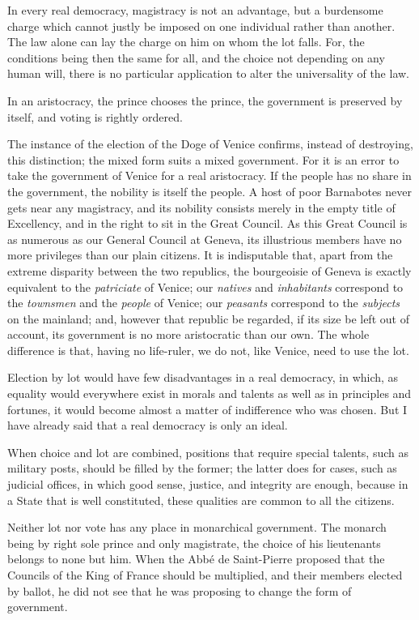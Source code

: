\documentclass[12pt]{book}
\begin{document}
In every real democracy, magistracy is not an advantage, but a burdensome charge which cannot justly be imposed on one individual rather than another. The law alone can lay the charge on him on whom the lot falls. For, the conditions being then the same for all, and the choice not depending on any human will, there is no particular application to alter the universality of the law.

In an aristocracy, the prince chooses the prince, the government is preserved by itself, and voting is rightly ordered.

The instance of the election of the Doge of Venice confirms, instead of destroying, this distinction; the mixed form suits a mixed government. For it is an error to take the government of Venice for a real aristocracy. If the people has no share in the government, the nobility is itself the people. A host of poor Barnabotes never gets near any magistracy, and its nobility consists merely in the empty title of Excellency, and in the right to sit in the Great Council. As this Great Council is as numerous as our General Council at Geneva, its illustrious members have no more privileges than our plain citizens. It is indisputable that, apart from the extreme disparity between the two republics, the bourgeoisie of Geneva is exactly equivalent to the \textit{patriciate} of Venice; our \textit{natives} and \textit{inhabitants} correspond to the \textit{townsmen} and the \textit{people} of Venice; our \textit{peasants} correspond to the \textit{subjects} on the mainland; and, however that republic be regarded, if its size be left out of account, its government is no more aristocratic than our own. The whole difference is that, having no life-ruler, we do not, like Venice, need to use the lot.

Election by lot would have few disadvantages in a real democracy, in which, as equality would everywhere exist in morals and talents as well as in principles and fortunes, it would become almost a matter of indifference who was chosen. But I have already said that a real democracy is only an ideal.

When choice and lot are combined, positions that require special talents, such as military posts, should be filled by the former; the latter does for cases, such as judicial offices, in which good sense, justice, and integrity are enough, because in a State that is well constituted, these qualities are common to all the citizens.

Neither lot nor vote has any place in monarchical government. The monarch being by right sole prince and only magistrate, the choice of his lieutenants belongs to none but him. When the Abb\'{e} de Saint-Pierre proposed that the Councils of the King of France should be multiplied, and their members elected by ballot, he did not see that he was proposing to change the form of government.
\end{document}
